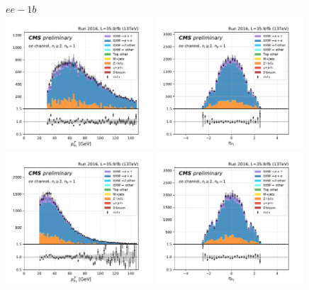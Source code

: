 












\begin{figure}[ht]
    \centering
    $ee - 1b$ \\
    \includegraphics[width=0.49\textwidth]{chapters/Analysis/sectionPlots/figures/kinematics_pickles/ee/1b/ee_1b_lepton1_pt.pdf}
    \includegraphics[width=0.49\textwidth]{chapters/Analysis/sectionPlots/figures/kinematics_pickles/ee/1b/ee_1b_lepton1_eta.pdf}
    \includegraphics[width=0.49\textwidth]{chapters/Analysis/sectionPlots/figures/kinematics_pickles/ee/1b/ee_1b_lepton2_pt.pdf}
    \includegraphics[width=0.49\textwidth]{chapters/Analysis/sectionPlots/figures/kinematics_pickles/ee/1b/ee_1b_lepton2_eta.pdf}

\end{figure}
